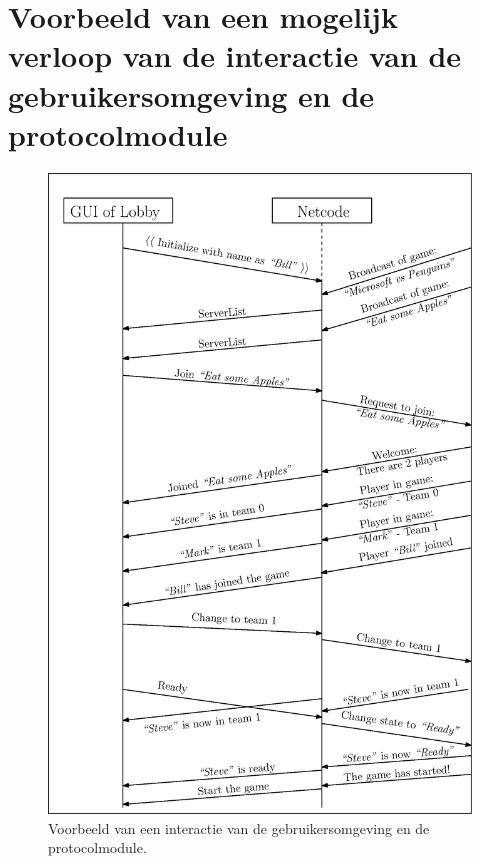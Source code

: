 \documentclass[a4paper,11pt]{article}
\begin{document}
    \section{Voorbeeld van een mogelijk verloop van de interactie van de gebruikersomgeving en de protocolmodule}
    \begin{figure}[h]
    	\centering
	\includegraphics[height=0.7\textheight]{../Class-diagram/MSCLobby-console.eps}
	\caption{Voorbeeld van een interactie van de gebruikersomgeving en de protocolmodule.}
    \end{figure}
    \label{app:MSCLobbyCon}
    
\end{document}
